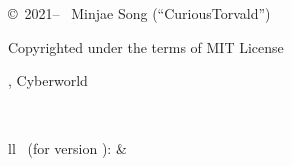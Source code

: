 \chapter*{\ }

\copyright\ 2021-- \ Minjae Song (``CuriousTorvald'')

Copyrighted under the terms of MIT License

\oreallypress, Cyberworld

\quad\\

\begin{center}
\begin{tabulary}{\textwidth}{ll}
\theedition\ (for version \tsvmver): & \thepublishingdate
\end{tabulary}
\end{center}
